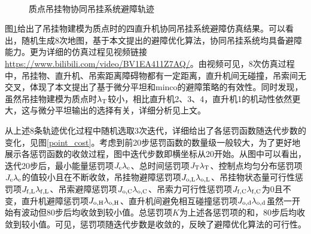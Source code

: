 \begin{figure}[htb!]
    \quad
    \\
    \caption{质点吊挂物协同吊挂系统避障轨迹\label{point_trajectory}}
\end{figure}

图\ref{point_trajectory}给出了吊挂物建模为质点时的四直升机协同吊挂系统避障仿真结果。可以看出，随机生成8次地图，基于本文提出的避障优化算法，协同吊挂系统均具备避障能力。更为详细的仿真过程见视频链接\href{https://www.bilibili.com/video/BV1EA411Z7AQ/}{https://www.bilibili.com/video/BV1EA411Z7AQ/}。由视频可见，8次仿真过程中，吊挂物、直升机、吊索距离障碍物都有一定距离，直升机间无碰撞，吊索间无交叉，体现了本文提出了基于微分平坦和minco的避障策略的有效性。同时发现，虽然吊挂物建模为质点时$\lambda_{\rm{T}}$较小，相比直升机2、3、4，直升机1的机动性依然更大，这与微分平坦输出的选择有关，详细分析见上文。

从上述8条轨迹优化过程中随机选取3次迭代，详细给出了各惩罚函数随迭代步数的变化，见图\ref{point_cost}。考虑到前20步惩罚函数的数量级一般较大，为了更好地展示各惩罚函数的收敛过程，图中迭代步数即横坐标从20开始。从图中可以看出，迭代20步后，最小能量惩罚项$J_{\rm{e}}\lambda_{\rm{e}}$、总时间惩罚项$J_{\rm{T}}\lambda_{\rm{T}}$、控制点均匀分布惩罚项$J_{\rm{e}}\lambda_{\rm{e}}$的值较小且在不断收敛，吊挂物避障惩罚项$J_{\rm{o,L}}\lambda_{\rm{o,L}}$、吊挂物状态量可行性惩罚项$J_{\rm{f,L}}\lambda_{\rm{f,L}}$、吊索避障惩罚项$J_{\rm{o,C}}\lambda_{\rm{o,C}}$、吊索力可行性惩罚项$J_{\rm{f,C}}\lambda_{\rm{f,C}}$为0且不变，直升机避障惩罚项$J_{\rm{o,H}}\lambda_{\rm{o,H}}$、直升机间避免相互碰撞惩罚项$J_{\rm{o,d}}\lambda_{\rm{o,d}}$虽然一开始有波动但80步后均收敛到较小值。总惩罚项$K$为上述各惩罚项的和，80步后均收敛到较小值。可见，惩罚项随迭代步数是收敛的，反映了避障优化算法的可行性。

